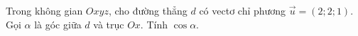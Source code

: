 \begin{ex}
Trong không gian $Oxyz$, cho đường thẳng $d$ có vectơ chỉ phương $\vec u=(2;2;1)$. Gọi $\alpha$ là góc giữa $d$ và trục $Ox$. Tính $\cos\alpha$.
\end{ex}
